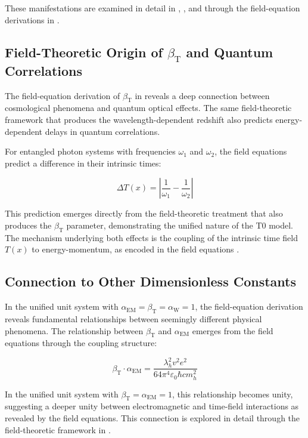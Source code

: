 \documentclass[12pt,a4paper]{article}
\newcommand{\Tfield}{T(x)}
\newcommand{\betaT}{\beta_{\text{T}}}
\newcommand{\alphaEM}{\alpha_{\text{EM}}}
\newcommand{\alphaW}{\alpha_{\text{W}}}
\begin{document}
	These manifestations are examined in detail in \cite{pascher_params_2025}, \cite{pascher_alphabeta_2025}, and through the field-equation derivations in \cite{pascher_photons_2025}.
	
	\subsection{Field-Theoretic Origin of \(\betaT\) and Quantum Correlations}
	\label{subsec:field_theoretic_origin}
	
	The field-equation derivation of \(\betaT\) in \cite{pascher_photons_2025} reveals a deep connection between cosmological phenomena and quantum optical effects. The same field-theoretic framework that produces the wavelength-dependent redshift also predicts energy-dependent delays in quantum correlations.
	
	For entangled photon systems with frequencies \(\omega_1\) and \(\omega_2\), the field equations predict a difference in their intrinsic times:
	
	\begin{equation}
		\Delta \Tfield = \left|\frac{1}{\omega_1} - \frac{1}{\omega_2}\right|
	\end{equation}
	
	This prediction emerges directly from the field-theoretic treatment that also produces the \(\betaT\) parameter, demonstrating the unified nature of the T0 model. The mechanism underlying both effects is the coupling of the intrinsic time field \(\Tfield\) to energy-momentum, as encoded in the field equations \cite{pascher_photons_2025}.
	
	\subsection{Connection to Other Dimensionless Constants}
	\label{subsec:connection_constants}
	
	In the unified unit system with \(\alphaEM = \betaT = \alphaW = 1\), the field-equation derivation reveals fundamental relationships between seemingly different physical phenomena. The relationship between \(\betaT\) and \(\alphaEM\) emerges from the field equations through the coupling structure:
	
	\begin{equation}
		\betaT \cdot \alphaEM = \frac{\lambda_h^2 v^2 e^2}{64\pi^4\varepsilon_0\hbar c m_h^2}
	\end{equation}
	
	In the unified unit system with \(\betaT = \alphaEM = 1\), this relationship becomes unity, suggesting a deeper unity between electromagnetic and time-field interactions as revealed by the field equations. This connection is explored in detail through the field-theoretic framework in \cite{pascher_photons_2025}.
	
\end{document}
